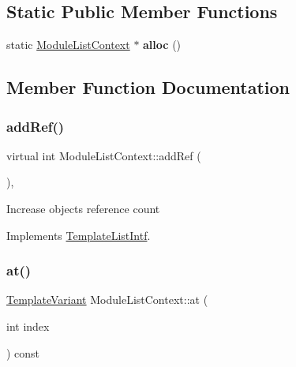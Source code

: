 \subsection*{Static Public Member Functions}
\begin{DoxyCompactItemize}
\item 
\mbox{\label{class_module_list_context_a5e6dee56ee7e5efcc8c7c3ce5694d262}} 
static \mbox{\hyperlink{class_module_list_context}{Module\+List\+Context}} $\ast$ {\bfseries alloc} ()
\end{DoxyCompactItemize}


\subsection{Member Function Documentation}
\mbox{\label{class_module_list_context_a88f218226c4fc48cfa07d0e48568c4ce}} 
\subsubsection{\texorpdfstring{addRef()}{addRef()}}
{\footnotesize\ttfamily virtual int Module\+List\+Context\+::add\+Ref (\begin{DoxyParamCaption}{ }\end{DoxyParamCaption})\hspace{0.3cm}{\ttfamily [inline]}, {\ttfamily [virtual]}}

Increase object\textquotesingle{}s reference count 

Implements \mbox{\hyperlink{class_template_list_intf_a4b4973e2e15396d10bc4e3085462ca2b}{Template\+List\+Intf}}.

\mbox{\label{class_module_list_context_a4548860492524e01ee703bd613fd08a7}} 
\subsubsection{\texorpdfstring{at()}{at()}}
{\footnotesize\ttfamily \mbox{\hyperlink{class_template_variant}{Template\+Variant}} Module\+List\+Context\+::at (\begin{DoxyParamCaption}\item[{int}]{index }\end{DoxyParamCaption}) const\hspace{0.3cm}{\ttfamily [virtual]}}

